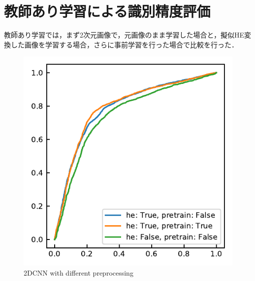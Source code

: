 \section{教師あり学習による識別精度評価}
教師あり学習では，まず2次元画像で，元画像のまま学習した場合と，擬似HE変換した画像を学習する場合，さらに事前学習を行った場合で比較を行った．
\begin{figure}
	\centering
	\includegraphics[width=0.6\linewidth]{fig/chapter4/2dcnn_preprocessing}
	\caption{2DCNN with different preprocessing}
	\label{fig:2dcnnpreprocessing}
\end{figure}


